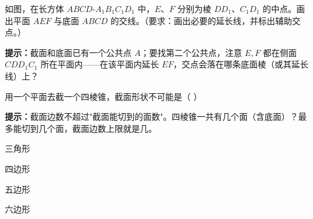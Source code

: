 \documentclass{exam-zh}
\begin{document}
\begin{problem}[points=10]
  \noindent
  \begin{minipage}[t]{\dimexpr\linewidth-60mm-6mm\relax}
    \vspace{0pt}
    如图，在长方体 $ABCD\text{-}A_1B_1C_1D_1$ 中，$E$、$F$ 分别为棱 $DD_1$、$C_1D_1$ 的中点。画出平面 $AEF$ 与底面 $ABCD$ 的交线。（要求：画出必要的延长线，并标出辅助交点。）

    \begin{hintbox}
\textbf{提示：}截面和底面已有一个公共点 $A$；要找第二个公共点，注意 $E,F$ 都在侧面 $CDD_1C_1$ 所在平面内——在该平面内延长 $EF$，交点会落在哪条底面棱（或其延长线）上？\end{hintbox}

  \end{minipage}\hfill
  \begin{diagramcoltikz}{60mm}{长方体，E 为 DD1 中点、F 为 C1D1 中点，画平面 AEF 与底面 ABCD 的交线。}
  }
  \end{diagramcoltikz}
  \par\medskip
  \answerarea[60mm]
\end{problem}



\begin{question}[points=6]
  \noindent
  \begin{minipage}[t]{\dimexpr\linewidth-60mm-6mm\relax}
    \vspace{0pt}
    用一个平面去截一个四棱锥，截面形状不可能是（    ）
    \begin{hintbox}
\textbf{提示：}截面边数不超过"截面能切到的面数"。四棱锥一共有几个面（含底面）？最多能切到几个面，截面边数上限就是几。\end{hintbox}

    \par
    \begin{choices}[columns=1]
      \item 三角形
      \item 四边形
      \item 五边形
      \item 六边形
    \end{choices}
  \end{minipage}\hfill
  \begin{diagramcoltikz}{60mm}{四棱锥有 5 个面（1 底面 + 4 侧面），截面边数最多 5。}
  }
  \end{diagramcoltikz}
\end{question}
\end{document}
